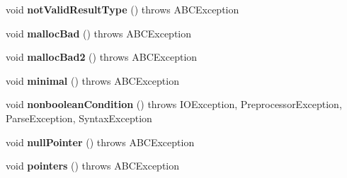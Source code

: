 \begin{DoxyCompactItemize}
\item 
\hypertarget{classedu_1_1udel_1_1cis_1_1vsl_1_1civl_1_1LanguageFeaturesTest_a29427aac93ab3ccacc4797d75e85682a}{}void {\bfseries not\+Valid\+Result\+Type} ()  throws A\+B\+C\+Exception \label{classedu_1_1udel_1_1cis_1_1vsl_1_1civl_1_1LanguageFeaturesTest_a29427aac93ab3ccacc4797d75e85682a}

\item 
\hypertarget{classedu_1_1udel_1_1cis_1_1vsl_1_1civl_1_1LanguageFeaturesTest_a17277a6971dd4caa6eded657d226d39b}{}void {\bfseries malloc\+Bad} ()  throws A\+B\+C\+Exception \label{classedu_1_1udel_1_1cis_1_1vsl_1_1civl_1_1LanguageFeaturesTest_a17277a6971dd4caa6eded657d226d39b}

\item 
\hypertarget{classedu_1_1udel_1_1cis_1_1vsl_1_1civl_1_1LanguageFeaturesTest_a000d70c05213e0a272f0d84dad7cbfaf}{}void {\bfseries malloc\+Bad2} ()  throws A\+B\+C\+Exception \label{classedu_1_1udel_1_1cis_1_1vsl_1_1civl_1_1LanguageFeaturesTest_a000d70c05213e0a272f0d84dad7cbfaf}

\item 
\hypertarget{classedu_1_1udel_1_1cis_1_1vsl_1_1civl_1_1LanguageFeaturesTest_aae34ae6942cad7a2e430cdddf604e793}{}void {\bfseries minimal} ()  throws A\+B\+C\+Exception \label{classedu_1_1udel_1_1cis_1_1vsl_1_1civl_1_1LanguageFeaturesTest_aae34ae6942cad7a2e430cdddf604e793}

\item 
\hypertarget{classedu_1_1udel_1_1cis_1_1vsl_1_1civl_1_1LanguageFeaturesTest_a5298849884ca486a0321e15c36c43173}{}void {\bfseries nonboolean\+Condition} ()  throws I\+O\+Exception, 			\+Preprocessor\+Exception, Parse\+Exception, Syntax\+Exception \label{classedu_1_1udel_1_1cis_1_1vsl_1_1civl_1_1LanguageFeaturesTest_a5298849884ca486a0321e15c36c43173}

\item 
\hypertarget{classedu_1_1udel_1_1cis_1_1vsl_1_1civl_1_1LanguageFeaturesTest_a56309a855da810dbe0b3a9a572b2b288}{}void {\bfseries null\+Pointer} ()  throws A\+B\+C\+Exception \label{classedu_1_1udel_1_1cis_1_1vsl_1_1civl_1_1LanguageFeaturesTest_a56309a855da810dbe0b3a9a572b2b288}

\item 
\hypertarget{classedu_1_1udel_1_1cis_1_1vsl_1_1civl_1_1LanguageFeaturesTest_a8ed4f5c0d65c40c6d1c9a1957816fe90}{}void {\bfseries pointers} ()  throws A\+B\+C\+Exception \label{classedu_1_1udel_1_1cis_1_1vsl_1_1civl_1_1LanguageFeaturesTest_a8ed4f5c0d65c40c6d1c9a1957816fe90}


\end{DoxyCompactItemize}

